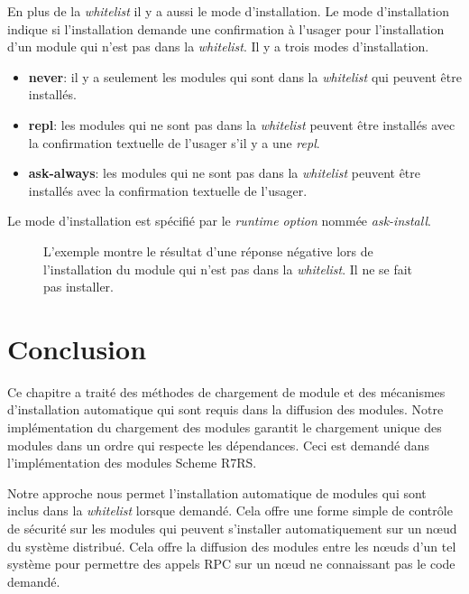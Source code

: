 En plus de la \textit{whitelist} il y a aussi le mode d'installation.
Le mode d'installation indique si l'installation demande une confirmation
à l'usager pour l'installation d'un module qui n'est pas dans la
\textit{whitelist}. Il y a trois modes d'installation.
\begin{itemize}
  \item \textbf{never}: il y a seulement les modules qui sont dans la
    \textit{whitelist} qui peuvent être installés.

  \item \textbf{repl}: les modules qui ne sont pas dans la \textit{whitelist}
    peuvent être installés avec la confirmation textuelle de l'usager s'il y a
    une \textit{repl}.

  \item \textbf{ask-always}: les modules qui ne sont pas dans la \textit{whitelist}
    peuvent être installés avec la confirmation textuelle de l'usager.
\end{itemize}

Le mode d'installation est spécifié par le \textit{runtime option} nommée
\textit{ask-install}.
\begin{figure}[h]
  \caption{L'exemple montre le résultat d'une réponse négative lors de
    l'installation du module qui n'est pas dans la \textit{whitelist}.
    Il ne se fait pas installer.}
\end{figure}


\section{Conclusion}

Ce chapitre a traité des méthodes de chargement de module et des mécanismes
d'installation automatique qui sont requis dans la diffusion des modules.
Notre implémentation du chargement des modules garantit le chargement unique
des modules dans un ordre qui respecte les dépendances. Ceci est demandé dans
l'implémentation des modules Scheme R7RS.

Notre approche nous permet l'installation automatique de modules qui sont
inclus dans la \textit{whitelist} lorsque demandé.  Cela offre une forme simple
de contrôle de sécurité sur les modules qui peuvent s'installer automatiquement
sur un nœud du système distribué. Cela offre la diffusion des modules entre les
nœuds d'un tel système pour permettre des appels RPC sur un nœud ne connaissant
pas le code demandé.





